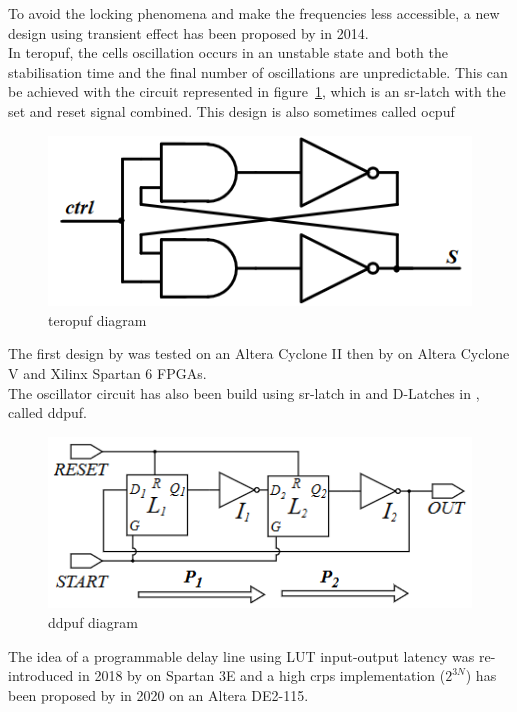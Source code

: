 To avoid the locking phenomena and make the frequencies less accessible, a new design using transient effect has been proposed by \cite{bossuet_puf_2014} in 2014.\\
In \acrfull{teropuf}, the cells oscillation occurs in an unstable state and both the stabilisation time and the final number of oscillations are unpredictable. This can be achieved with the circuit represented in figure~\ref{fig:TEROPUF}, which is an \acrfull{sr-latch} with the set and reset signal combined. This design is also sometimes called \acrfull{ocpuf}

\begin{figure}[H]
    \centering
    \includegraphics[width=0.5\linewidth]{images/TEROPUF.png}
    \caption{\acrshort{teropuf} diagram \cite{bossuet_puf_2014}}
    \label{fig:TEROPUF}
\end{figure}

The first design by \cite{bossuet_puf_2014} was tested on an Altera Cyclone II then by \cite{marchand_design_2016} on Altera Cyclone V and Xilinx Spartan 6 FPGAs.\\

The oscillator circuit has also been build using \acrshort{sr-latch} in \cite{habib_implementation_2017} and D-Latches in \cite{della_sala_novel_2021}, called \acrfull{ddpuf}.\\

\begin{figure}[H]
    \centering
    \includegraphics[width=0.5\linewidth]{images/DDPUF.png}
    \caption{\acrshort{ddpuf} diagram \cite{della_sala_novel_2021}}
    \label{fig:DDPUF}
\end{figure}

The idea of a programmable delay line using LUT input-output latency was re-introduced in 2018 by \cite{ardakani_improving_2018} on Spartan 3E and a high \acrshort{crp}s implementation ($2^{3N}$) has been proposed by \cite{zhang_highly_2020} in 2020 on an Altera DE2-115.\\

